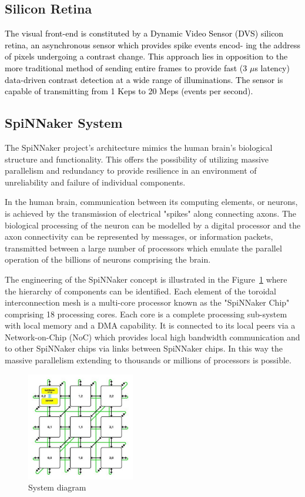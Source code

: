 \documentclass[journal]{journal}
\begin{document}
\subsection{Silicon Retina}
\textcolor{black}{
The visual front-end is constituted by a Dynamic Video Sensor (DVS) silicon retina, an asynchronous sensor which provides spike events encod-
ing the address of pixels undergoing a contrast change\cite{wei2006robust}. 
This approach lies in opposition to the more traditional method of sending entire frames to provide fast (3 $\mu$s latency) data-driven contrast detection at a wide range of illuminations. 
The sensor is capable of transmitting from 1 Keps to 20 Meps (events per
second).}

\subsection{SpiNNaker System}
The SpiNNaker project's architecture mimics the human brain's biological structure and functionality. 
This offers the possibility of utilizing massive parallelism and redundancy to provide resilience in an environment of unreliability and failure of individual components.

In the human brain, communication between its computing elements, or neurons, is achieved by the transmission of electrical "spikes" along connecting axons. 
The biological processing of the neuron can be modelled by a digital processor and the axon connectivity can be represented by messages, or information packets, transmitted between a large number of processors which emulate the parallel operation of the billions of neurons comprising the brain.

The engineering of the SpiNNaker concept is illustrated in the Figure~\ref{fig:sysdia} where the hierarchy of components can be identified. 
Each element of the toroidal interconnection mesh is a multi-core processor known as the "SpiNNaker Chip" comprising 18 processing cores. 
Each core is a complete processing sub-system with local memory and a DMA capability. 
It is connected to its local peers via a Network-on-Chip (NoC) which provides local high bandwidth communication and to other SpiNNaker chips via links between SpiNNaker chips. 
In this way the massive parallelism extending to thousands or millions of processors is possible.

\begin{figure}
\centering
	\includegraphics[width=0.42\textwidth]{pics/mesh_ctiff.jpg}
	\caption{System diagram}
	\label{fig:sysdia}
\end{figure}
\end{document}
